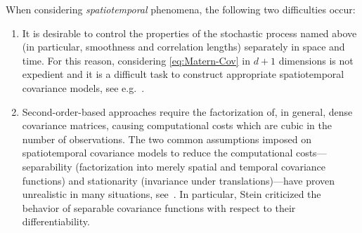 \documentclass[reqno]{amsart}
\numberwithin{equation}{section}
\theoremstyle{remark}
\theoremstyle{definition}
\begin{document}
When considering \emph{spatiotemporal} 
phenomena, the following two difficulties occur: 
%
\begin{enumerate}[label=\arabic*., leftmargin=1cm,topsep=1mm] 
	\item It is desirable to control the properties 
	of the stochastic process named above 
	(in particular, smoothness and correlation lengths) 
	separately in space and time. For this reason, 
	considering \eqref{eq:Matern-Cov} 
	in $d+1$ dimensions is not expedient 
	and it is a difficult task to construct appropriate 
	spatiotemporal covariance 
	models, see e.g.~\cite{Cressie1999, Fuentes2008, Gneiting2002,  
		Porcu2021, Porcu2007, Stein2005space}. 
	\item Second-order-based approaches require 
	the factorization of, in general, dense covariance matrices, 
	causing computational costs which 
	are
	cubic 
	in the number of observations. 
	The two common assumptions 
	imposed on spatiotemporal covariance models 
	to reduce the computational 
	costs---separability 
	(factorization into merely 
	spatial and temporal covariance functions) 
	and 
	stationarity 
	(invariance under translations)---have 
	proven unrealistic in many situations, 
	see~\cite{Cressie2011, Mateu2008, Stein2005space}. 
	In particular, Stein \cite{Stein2005space} 
	criticized the  
	behavior of separable covariance functions 
	with respect to their differentiability. 
\end{enumerate} 
%
\end{document}
